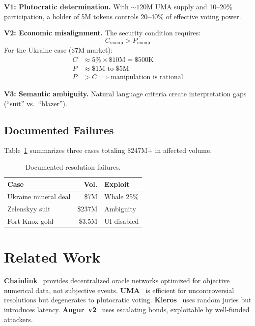 \documentclass[11pt,a4paper,twocolumn]{article}
\begin{document}
\textbf{V1: Plutocratic determination.} With ${\sim}120$M UMA supply and 10--20\% participation, a holder of 5M tokens controls 20--40\% of effective voting power.

\textbf{V2: Economic misalignment.} The security condition requires:
\begin{equation}
    C_{\text{manip}} > P_{\text{manip}}
    \label{eq:security}
\end{equation}
For the Ukraine case (\$7M market):
\begin{align}
    C &\approx 5\% \times \$10\text{M} = \$500\text{K} \nonumber \\
    P &\approx \$1\text{M to } \$5\text{M} \nonumber \\
    P &> C \implies \text{manipulation is rational}
    \label{eq:cost}
\end{align}

\textbf{V3: Semantic ambiguity.} Natural language criteria create interpretation gaps (``suit'' vs.\ ``blazer'').

\subsection{Documented Failures}

Table~\ref{tab:failures} summarizes three cases totaling \$247M+ in affected volume.

\begin{table}[h]
\centering
\caption{Documented resolution failures.}
\label{tab:failures}
\footnotesize
\begin{tabularx}{\columnwidth}{@{}Xrl@{}}
\toprule
\textbf{Case} & \textbf{Vol.} & \textbf{Exploit} \\
\midrule
Ukraine mineral deal & \$7M & Whale 25\% \\
Zelenskyy suit & \$237M & Ambiguity \\
Fort Knox gold & \$3.5M & UI disabled \\
\bottomrule
\end{tabularx}
\end{table}

\section{Related Work}

\textbf{Chainlink}~\cite{chainlink2021} provides decentralized oracle networks optimized for objective numerical data, not subjective events. \textbf{UMA}~\cite{uma2020} is efficient for uncontroversial resolutions but degenerates to plutocratic voting. \textbf{Kleros}~\cite{kleros2017} uses random juries but introduces latency. \textbf{Augur~v2}~\cite{augur2015} uses escalating bonds, exploitable by well-funded attackers.
\end{document}
